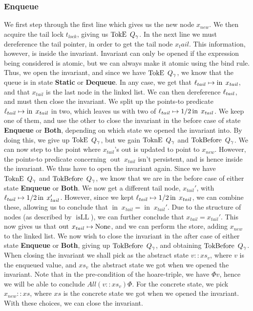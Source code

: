 \documentclass[twoside,11pt,openright]{report}
\newcommand{\isLL}{\operatorname{isLL}}
\newcommand{\nIn}[1]{\operatorname{in} \; #1}
\newcommand{\nOut}[1]{\operatorname{out} \; #1}
\newcommand{\StaticState}{\textbf{Static}}
\newcommand{\EnqueueState}{\textbf{Enqueue}}
\newcommand{\DequeueState}{\textbf{Dequeue}}
\newcommand{\BothState}{\textbf{Both}}
\newcommand{\Qgnames}{Q_\gname}
\newcommand{\TokE}[1]{\operatorname{TokE}\ #1}
\newcommand{\TokEQg}{\TokE{\Qgnames}}
\newcommand{\ToknE}[1]{\operatorname{ToknE}\ #1}
\newcommand{\ToknEQg}{\ToknE{\Qgnames}}
\newcommand{\TokBefore}[1]{\operatorname{TokBefore}\ #1}
\newcommand{\TokBeforeQg}{\TokBefore{\Qgnames}}
\newcommand{\TokAfterQg}{\TokBefore{\Qgnames}}
\begin{document}
\subsubsection{Enqueue}
We first step through the first line which gives us the new node $x_{new}$. We then acquire the tail lock $t_{lock}$, giving us $\TokEQg$. In the next line we must dereference the tail pointer, in order to get the tail node $x_tail$. This information, however, is inside the invariant. Invariant can only be opened if the expression being considered is atomic, but we can always make it atomic using the bind rule. Thus, we open the invariant, and since we have $\TokEQg$, we know that the queue is in state \StaticState{} or \DequeueState{}. In any case, we get that $\loc_{tail} \mapsto \nIn{x_{tail}}$, and that $x_{tail}$ is the last node in the linked list. We can then dereference $\ell_{tail}$, and must then close the invariant. We split up the points-to predicate $\loc_{tail} \mapsto \nIn{x_{tail}}$ in two, which leaves us with two of $\loc_{tail} \mapsto{1/2} \nIn{x_{tail}}$. We keep one of them, and use the other to close the invariant in the before case of state \EnqueueState{} or \BothState{}, depending on which state we opened the invariant into. By doing this, we give up $\TokEQg$, but we gain $\ToknEQg$ and $\TokAfterQg$. We can now step to the point where $x_{tail}$'s out is updated to point to $x_{new}$. However, the points-to predicate concerning $\nOut{x_{tail}}$ isn't persistent, and is hence inside the invariant. We thus have to open the invariant again. Since we have $\ToknEQg$ and $\TokAfterQg$, we know that we are in the before case of either state \EnqueueState{} or \BothState{}. We now get a different tail node, $x_{tail}'$, with $\loc_{tail} \mapsto{1/2} \nIn{x_{tail}'}$. However, since we kept $\loc_{tail} \mapsto{1/2} \nIn{x_{tail}}$, we can combine these, allowing us to conclude that $\nIn{x_{tail}} = \nIn{x_{tail}'}$. Due to the structure of nodes (as described by $\isLL$), we can further conclude that $x_{tail} = x_{tail}'$. This now gives us that $\nOut{x_{tail}} \mapsto \None$, and we can perform the store, adding $x_{new}$ to the linked list. We now wish to close the invariant in the after case of either state \EnqueueState{} or \BothState{}, giving up $\TokAfterQg$, and obtaining $\TokBeforeQg$. When closing the invariant we shall pick as the abstract state $v :: xs_v$, where $v$ is the enqueued value, and $xs_v$ the abstract state we got when we opened the invariant. Note that in the pre-condition of the hoare-triple, we have $\Phi v$, hence we will be able to conclude $All (v :: xs_v) \Phi$. For the concrete state, we pick $x_{new} :: xs$, where $xs$ is the concrete state we got when we opened the invariant. With these choices, we can close the invariant.\\
\end{document}
